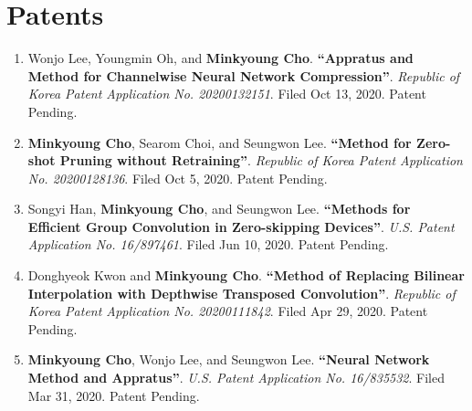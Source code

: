 \documentclass[letterpaper,oneside,11pt]{article}
\begin{document}
\section{Patents}
\begin{enumerate}[leftmargin=*, itemsep=0em]
  \item \small Wonjo Lee, Youngmin Oh, and \textbf{Minkyoung Cho}. \textbf{``Appratus and Method for Channelwise Neural Network Compression''}. \textit{Republic of Korea Patent Application No. 20200132151}. Filed Oct 13, 2020. Patent Pending.
  \item \small \textbf{Minkyoung Cho}, Searom Choi, and Seungwon Lee. \textbf{``Method for Zero-shot Pruning without Retraining''}. \textit{Republic of Korea Patent Application No. 20200128136}. Filed Oct 5, 2020. Patent Pending.
  \item \small Songyi Han, \textbf{Minkyoung Cho}, and Seungwon Lee. \textbf{``Methods for Efficient Group Convolution in Zero-skipping Devices''}. \textit{U.S. Patent Application No. 16/897461}. Filed Jun 10, 2020. Patent Pending.
  \item \small Donghyeok Kwon and \textbf{Minkyoung Cho}. \textbf{``Method of Replacing Bilinear Interpolation with Depthwise Transposed Convolution''}. \textit{Republic of Korea Patent Application No. 20200111842}. Filed Apr 29, 2020. Patent Pending.
  \item \small \textbf{Minkyoung Cho}, Wonjo Lee, and Seungwon Lee. \textbf{``Neural Network Method and Appratus''}. \textit{U.S. Patent Application No. 16/835532}. Filed Mar 31, 2020. Patent Pending.
\end{enumerate}

\end{document}
